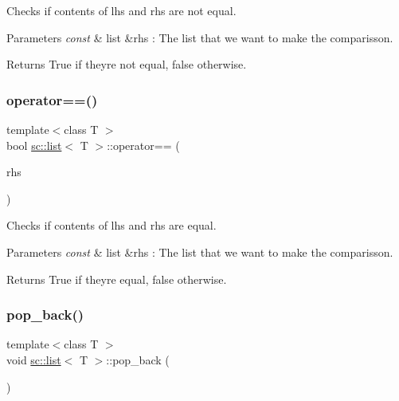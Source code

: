 Checks if contents of lhs and rhs are not equal. 


\begin{DoxyParams}{Parameters}
{\em const} & list \&rhs \+: The list that we want to make the comparisson. \\
\hline
\end{DoxyParams}
\begin{DoxyReturn}{Returns}
True if they\textquotesingle{}re not equal, false otherwise. 
\end{DoxyReturn}
\mbox{\label{classsc_1_1list_aaf499f0f0f272bfdc2700fa09570e369}} 
\subsubsection{\texorpdfstring{operator==()}{operator==()}}
{\footnotesize\ttfamily template$<$class T $>$ \\
bool \mbox{\hyperlink{classsc_1_1list}{sc\+::list}}$<$ T $>$\+::operator== (\begin{DoxyParamCaption}\item[{const \mbox{\hyperlink{classsc_1_1list}{list}}$<$ T $>$ \&}]{rhs }\end{DoxyParamCaption})}



Checks if contents of lhs and rhs are equal. 


\begin{DoxyParams}{Parameters}
{\em const} & list \&rhs \+: The list that we want to make the comparisson. \\
\hline
\end{DoxyParams}
\begin{DoxyReturn}{Returns}
True if they\textquotesingle{}re equal, false otherwise. 
\end{DoxyReturn}
\mbox{\label{classsc_1_1list_a3d6fc0a4f2c1db7c74af5a482c1a03ca}} 
\subsubsection{\texorpdfstring{pop\+\_\+back()}{pop\_back()}}
{\footnotesize\ttfamily template$<$class T $>$ \\
void \mbox{\hyperlink{classsc_1_1list}{sc\+::list}}$<$ T $>$\+::pop\+\_\+back (\begin{DoxyParamCaption}{ }\end{DoxyParamCaption})}



